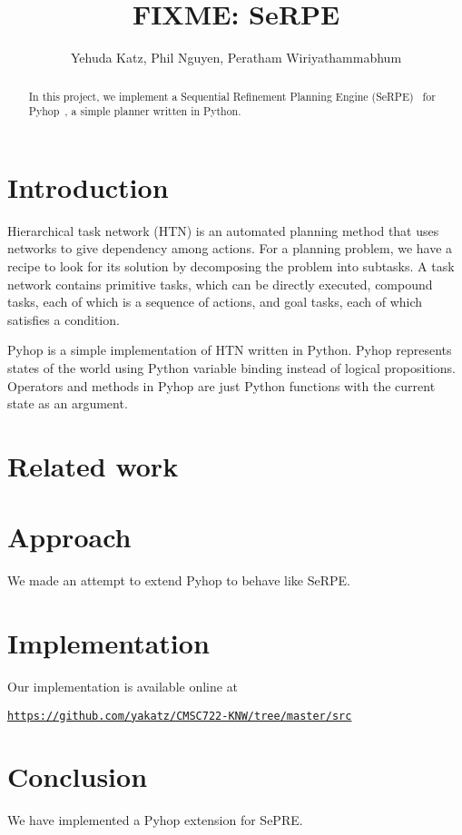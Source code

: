 \documentclass[11pt]{article} %
\title{FIXME: SeRPE}
\author{Yehuda Katz, Phil Nguyen, Peratham Wiriyathammabhum}
\begin{document}
\maketitle

\begin{abstract}
In this project, we implement a Sequential Refinement Planning Engine
(SeRPE)~\cite{disgusting-draft} for Pyhop~\cite{pyhop},
a simple planner written in Python.
\end{abstract}

\section{Introduction}

Hierarchical task network (HTN) is an automated planning method that uses networks
to give dependency among actions.
For a planning problem, we have a recipe to look for its solution
by decomposing the problem into subtasks.
A task network contains primitive tasks, which can be directly executed,
compound tasks, each of which is a sequence of actions,
and goal tasks, each of which satisfies a condition.

Pyhop is a simple implementation of HTN written in Python. 
Pyhop represents states of the world using Python variable binding
 instead of logical propositions. Operators and methods in Pyhop are
 just Python functions with the current state as an argument.



\section{Related work}

\section{Approach}
We made an attempt to extend Pyhop to behave like SeRPE.

\section{Implementation}

Our implementation is available online at
\begin{center}
\href{https://github.com/yakatz/CMSC722-KNW/tree/master/src}
{\tt https://github.com/yakatz/CMSC722-KNW/tree/master/src}
\end{center}


\section{Conclusion}

We have implemented a Pyhop extension for SePRE.



\end{document}
